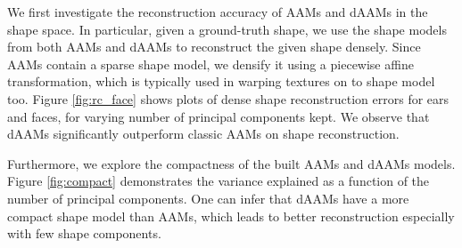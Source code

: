 We first investigate the reconstruction accuracy of AAMs and dAAMs in the shape space. In particular, given a ground-truth shape, we use the shape models from both AAMs and dAAMs to reconstruct the given shape densely. Since AAMs contain a sparse shape model, we densify it using a piecewise affine transformation, which is typically used in warping textures on to shape model too. Figure \ref{fig:rc_face} shows plots of dense shape reconstruction errors for ears and faces, for varying number of principal components kept. We observe that dAAMs significantly outperform classic AAMs on shape reconstruction. 


Furthermore, we explore the compactness of the built AAMs and dAAMs models. 
Figure \ref{fig:compact} demonstrates the variance explained as a function of the number of principal components. One can infer that dAAMs have a more compact shape model than AAMs, which leads to better reconstruction especially with few shape components.

